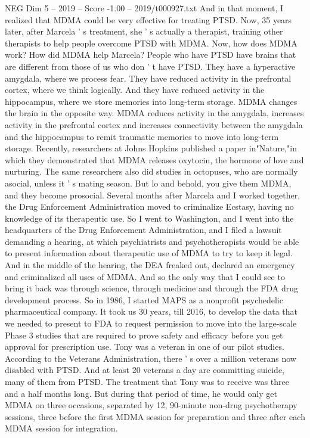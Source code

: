 \begin{textsample}{NEG Dim 5 – 2019 – Score -1.00 – 2019/t000927.txt}
And in that moment, I realized that MDMA could be very effective for treating PTSD.
Now, 35 years later, after Marcela ' s treatment, she ' s actually a therapist, training other therapists to help people overcome PTSD with MDMA.
Now, how does MDMA work?
How did MDMA help Marcela?
People who have PTSD have brains that are different from those of us who don ' t have PTSD.
They have a hyperactive amygdala, where we process fear.
They have reduced activity in the prefrontal cortex, where we think logically.
And they have reduced activity in the hippocampus, where we store memories into long-term storage.
MDMA changes the brain in the opposite way.
MDMA reduces activity in the amygdala, increases activity in the prefrontal cortex and increases connectivity between the amygdala and the hippocampus to remit traumatic memories to move into long-term storage.
Recently, researchers at Johns Hopkins published a paper in"Nature,"in which they demonstrated that MDMA releases oxytocin, the hormone of love and nurturing.
The same researchers also did studies in octopuses, who are normally asocial, unless it ' s mating season.
But lo and behold, you give them MDMA, and they become prosocial.
Several months after Marcela and I worked together, the Drug Enforcement Administration moved to criminalize Ecstasy, having no knowledge of its therapeutic use.
So I went to Washington, and I went into the headquarters of the Drug Enforcement Administration, and I filed a lawsuit demanding a hearing, at which psychiatrists and psychotherapists would be able to present information about therapeutic use of MDMA to try to keep it legal.
And in the middle of the hearing, the DEA freaked out, declared an emergency and criminalized all uses of MDMA.
And so the only way that I could see to bring it back was through science, through medicine and through the FDA drug development process.
So in 1986, I started MAPS as a nonprofit psychedelic pharmaceutical company.
It took us 30 years, till 2016, to develop the data that we needed to present to FDA to request permission to move into the large-scale Phase 3 studies that are required to prove safety and efficacy before you get approval for prescription use.
Tony was a veteran in one of our pilot studies.
According to the Veterans Administration, there ' s over a million veterans now disabled with PTSD.
And at least 20 veterans a day are committing suicide, many of them from PTSD.
The treatment that Tony was to receive was three and a half months long.
But during that period of time, he would only get MDMA on three occasions, separated by 12, 90-minute non-drug psychotherapy sessions, three before the first MDMA session for preparation and three after each MDMA session for integration.

\end{textsample}
